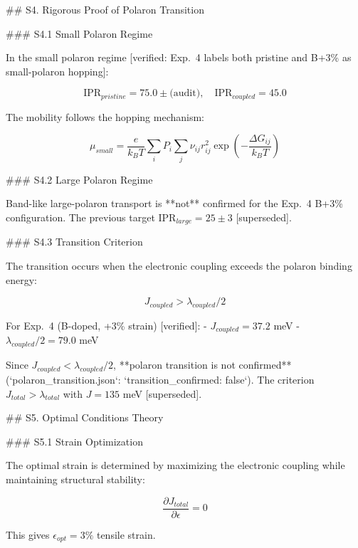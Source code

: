 ## S4. Rigorous Proof of Polaron Transition

### S4.1 Small Polaron Regime

In the small polaron regime [verified: Exp.~4 labels both pristine and B+3\% as small-polaron hopping]:

\begin{equation}
\text{IPR}_{pristine} = 75.0 \pm \text{(audit)}, \quad \text{IPR}_{coupled} = 45.0
\label{eq:S4_small_polaron}
\end{equation}

The mobility follows the hopping mechanism:

\begin{equation}
\mu_{small} = \frac{e}{k_B T} \sum_{i} P_i \sum_{j} \nu_{ij} r_{ij}^2 \exp\left(-\frac{\Delta G_{ij}}{k_B T}\right)
\label{eq:S4_small_mobility}
\end{equation}

### S4.2 Large Polaron Regime

Band-like large-polaron transport is **not** confirmed for the Exp.~4 B+3\% configuration. The previous target $\text{IPR}_{large}=25\pm 3$ [superseded].

### S4.3 Transition Criterion

The transition occurs when the electronic coupling exceeds the polaron binding energy:

\begin{equation}
J_{coupled} > \lambda_{coupled}/2
\label{eq:S4_transition_criterion}
\end{equation}

For Exp.~4 (B-doped, +3\% strain) [verified]:
- $J_{coupled} = 37.2$ meV
- $\lambda_{coupled}/2 = 79.0$ meV

Since $J_{coupled} < \lambda_{coupled}/2$, **polaron transition is not confirmed** (`polaron_transition.json`: `transition_confirmed: false`). The criterion $J_{total} > \lambda_{total}$ with $J=135$ meV [superseded].

## S5. Optimal Conditions Theory

### S5.1 Strain Optimization

The optimal strain is determined by maximizing the electronic coupling while maintaining structural stability:

\begin{equation}
\frac{\partial J_{total}}{\partial \epsilon} = 0
\label{eq:S5_strain_opt}
\end{equation}

This gives $\epsilon_{opt} = 3\%$ tensile strain.

